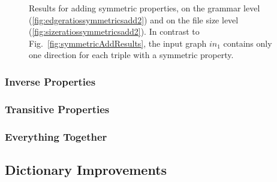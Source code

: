 \begin{figure}[h]
	\centering
	\hfill 
	\caption{Results for adding symmetric properties, on the grammar level (\ref{fig:edgeratiossymmetricsadd2}) and on the file size level (\ref{fig:sizeratiossymmetricsadd2}). In contrast to Fig.~\ref{fig:symmetricAddResults}, the input graph $in_1$ contains only one direction for each triple with a symmetric property.}
	\label{fig:symmetricAddResults2}
\end{figure}


\subsubsection{Inverse Properties}

\subsubsection{Transitive Properties}

\subsubsection{Everything Together}

\subsection{Dictionary Improvements}\label{sec:evaluationDictImprovements}


